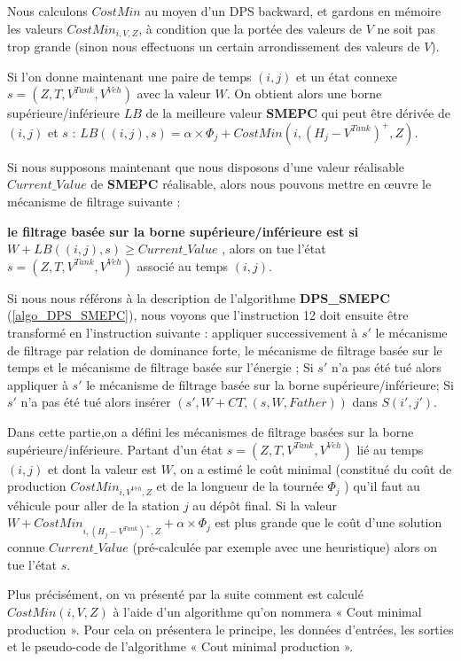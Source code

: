 Nous calculons $CostMin$ au moyen d'un DPS backward, et gardons en mémoire les valeurs $CostMin_{i, V, Z}$, à condition que la portée des valeurs de $V$ ne soit pas trop grande (sinon nous effectuons un certain arrondissement des valeurs de $V$).

Si l'on donne maintenant une paire de temps $(i, j)$ et un état connexe $s = (Z, T, V^{Tank}, V^{Veh})$ avec la valeur $W$. On obtient alors une borne supérieure/inférieure $LB$ de la meilleure valeur \textbf{SMEPC} qui peut être dérivée de $(i, j)$ et $s$ : $LB((i, j), s) = \alpha \times \Phi_j+ CostMin(i, (H_j - V^{Tank})^+, Z)$.

Si nous supposons maintenant que nous disposons d'une valeur réalisable $Current\_Value$ de \textbf{SMEPC} réalisable, alors nous pouvons mettre en œuvre le mécanisme de filtrage suivante : 

\textbf{ le filtrage basée sur la borne supérieure/inférieure est si $W+LB((i,j),s)\geq Current\_Value$ }, alors on tue l'état $s = (Z, T, V^{Tank}, V^{Veh})$ associé au temps $(i,j)$.

Si nous nous référons à la description de l'algorithme \textbf{DPS\_SMEPC} (\ref{algo_DPS_SMEPC}), nous voyons que l'instruction 12 doit ensuite être transformé en l'instruction suivante :
appliquer successivement à $s'$ le mécanisme de filtrage par relation de dominance forte, le mécanisme de filtrage basée sur le temps et le mécanisme de filtrage basée sur l'énergie ;
Si $s'$ n'a pas été tué alors appliquer à $s'$ le mécanisme de filtrage basée sur la borne supérieure/inférieure;
Si $s'$ n'a pas été tué alors insérer $(s', W + CT, (s, W, Father))$ dans $S(i', j') $.

Dans cette partie,on a défini les mécanismes de filtrage basées sur la borne supérieure/inférieure. Partant d'un état $ s = (Z, T, V^{Tank}, V^{Veh})$ lié au temps $(i, j)$ et dont la valeur est $W$, on a estimé le coût minimal (constitué du coût de production $CostMin_{i,V^{Veh}, Z}$ et de la longueur de la tournée $\Phi_j$ ) qu'il faut au véhicule pour aller de la station $j$ au dépôt final. Si la valeur $W + CostMin_{i,(H_j - V^{Tank})^+, Z} + \alpha \times \Phi_j$ est plus grande que le coût d'une solution connue $Current\_Value$ (pré-calculée par exemple avec une heuristique) alors on tue l'état $s$.%

Plus précisément, on va présenté par la suite comment est calculé $CostMin(i, V, Z)$ à l'aide d'un algorithme qu'on nommera « Cout minimal production ». Pour cela on présentera le principe, les données d'entrées, les sorties et le pseudo-code de l'algorithme « Cout minimal production ».

